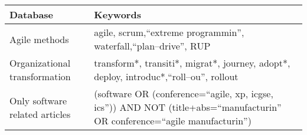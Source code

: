 \centering
{} \label{keywordtable}
\begin{tabular}{l p{30em}}
    \bfseries{Database} & \bfseries{Keywords} \\
    \hline
    Agile methods & agile, scrum,``extreme programmin'', waterfall,``plan–drive'', RUP \\
    Organizational transformation & transform*, transiti*, migrat*, journey, adopt*, deploy, introduc*,``roll–ou'', rollout \\
    Only software related articles & (software OR (conference=``agile, xp, icgse, ics'')) AND NOT (title+abs=``manufacturin'' OR conference=``agile manufacturin'') \\
    \hline
\end{tabular}

\justify
